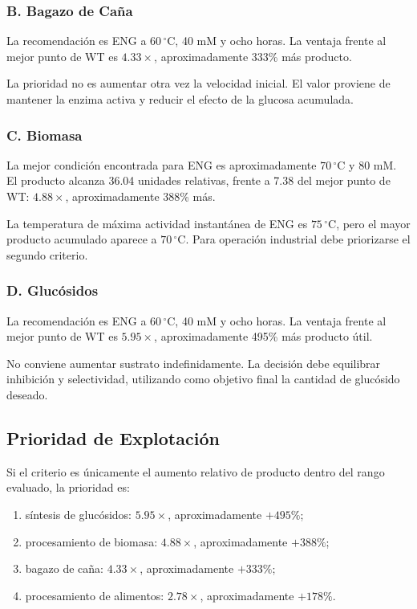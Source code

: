 \subsubsection{B. Bagazo de Caña}

La recomendación es ENG a \(60\,^{\circ}\mathrm{C}\), 40 mM y ocho horas.
La ventaja frente al mejor punto de WT es \(4.33\times\), aproximadamente
333\% más producto.

La prioridad no es aumentar otra vez la velocidad inicial. El valor proviene de
mantener la enzima activa y reducir el efecto de la glucosa acumulada.

\subsubsection{C. Biomasa}

La mejor condición encontrada para ENG es aproximadamente
\(70\,^{\circ}\mathrm{C}\) y 80 mM. El producto alcanza 36.04 unidades relativas,
frente a 7.38 del mejor punto de WT: \(4.88\times\), aproximadamente 388\% más.

La temperatura de máxima actividad instantánea de ENG es
\(75\,^{\circ}\mathrm{C}\), pero el mayor producto acumulado aparece a
\(70\,^{\circ}\mathrm{C}\). Para operación industrial debe priorizarse el segundo
criterio.

\subsubsection{D. Glucósidos}

La recomendación es ENG a \(60\,^{\circ}\mathrm{C}\), 40 mM y ocho horas.
La ventaja frente al mejor punto de WT es \(5.95\times\), aproximadamente
495\% más producto útil.

No conviene aumentar sustrato indefinidamente. La decisión debe equilibrar
inhibición y selectividad, utilizando como objetivo final la cantidad de
glucósido deseado.

\subsection{Prioridad de Explotación}
\label{subsec:prioridad_inversion}

Si el criterio es únicamente el aumento relativo de producto dentro del rango
evaluado, la prioridad es:

\begin{enumerate}
    \item síntesis de glucósidos: \(5.95\times\), aproximadamente \(+495\%\);
    \item procesamiento de biomasa: \(4.88\times\), aproximadamente \(+388\%\);
    \item bagazo de caña: \(4.33\times\), aproximadamente \(+333\%\);
    \item procesamiento de alimentos: \(2.78\times\), aproximadamente \(+178\%\).
\end{enumerate}

